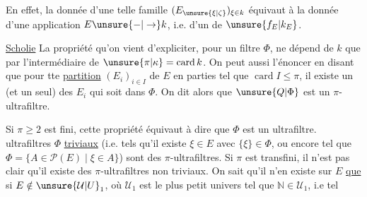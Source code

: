 

En effet, la donnée d'une telle famille $(E_{\unsure{\xi|\zeta}})_{\xi\in k}$ équivaut à la donnée d'une application $E\unsure{-|\to}k$, i.e. d'un  de $\unsure{f_E|k_E}$. 

 \uline{Scholie} La propriété qu'on vient d'expliciter, pour un filtre $\Phi$, ne dépend  de $k$ que par l'intermédiaire de $\unsure{\pi|\kappa}=\operatorname{card}k$. On peut aussi l'énoncer en disant que pour tte \uline{partition} $(E_i)_{i\in I}$ de $E$ en  parties tel que $\operatorname{card}I\leq\pi$, il existe un (et un seul) des $E_i$ qui soit dans $\Phi$. On dit alors que $\unsure{Q|\Phi}$ est un $\pi$-ultrafiltre.

Si $\pi\geq 2$ est fini, cette propriété équivaut à dire que $\Phi$ est un ultrafiltre.   ultrafiltres $\Phi$ \uline{triviaux} \unsure{(}(i.e. tels qu'il existe $\xi\in E$ avec $\{\xi\}\in\Phi$, ou encore \deleted{\unsure{$\Phi$}} tel que $\Phi=\{A\in\mathcal P(E)\mid\xi\in A\}$) sont des $\pi$-ultrafiltres.  Si $\pi$ est transfini, il n'est pas clair qu'il existe des $\pi$-ultrafiltres non triviaux. On sait qu'il n'en existe sur $E$ \uline{que} si  $E\notin\unsure{\mathcal U|U}_1$, où $\mathcal U_1$ est le plus petit univers  tel que $\mathbb N\in\mathcal U_1$, i.e tel

